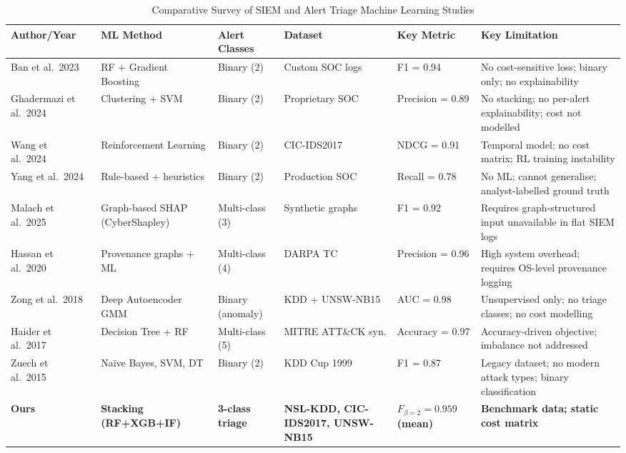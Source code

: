 \documentclass[conference]{IEEEtran}
\begin{document}
\begin{table}[!t]
\centering
\caption{Comparative Survey of SIEM and Alert Triage Machine Learning Studies}
\label{tab:related_comparison}
\renewcommand{\arraystretch}{1.15}
\begin{tabular}{p{2.8cm} p{2.6cm} p{1.8cm} p{2.6cm} p{2.0cm} p{4.0cm}}
\toprule
\textbf{Author/Year} & \textbf{ML Method} & \textbf{Alert Classes} & \textbf{Dataset} & \textbf{Key Metric} & \textbf{Key Limitation} \\
\midrule
Ban et al.\ 2023~\cite{ban2023}
  & RF + Gradient Boosting
  & Binary (2)
  & Custom SOC logs
  & F1 = 0.94
  & No cost-sensitive loss; binary only; no explainability \\
\midrule
Ghadermazi et al.\ 2024~\cite{ghadermazi2024}
  & Clustering + SVM
  & Binary (2)
  & Proprietary SOC
  & Precision = 0.89
  & No stacking; no per-alert explainability; cost not modelled \\
\midrule
Wang et al.\ 2024~\cite{wang2024}
  & Reinforcement Learning
  & Binary (2)
  & CIC-IDS2017
  & NDCG = 0.91
  & Temporal model; no cost matrix; RL training instability \\
\midrule
Yang et al.\ 2024~\cite{yang2024}
  & Rule-based + heuristics
  & Binary (2)
  & Production SOC
  & Recall = 0.78
  & No ML; cannot generalise; analyst-labelled ground truth \\
\midrule
Malach et al.\ 2025~\cite{malach2025}
  & Graph-based SHAP (CyberShapley)
  & Multi-class (3)
  & Synthetic graphs
  & F1 = 0.92
  & Requires graph-structured input unavailable in flat SIEM logs \\
\midrule
Hassan et al.\ 2020~\cite{hassan2019}
  & Provenance graphs + ML
  & Multi-class (4)
  & DARPA TC
  & Precision = 0.96
  & High system overhead; requires OS-level provenance logging \\
\midrule
Zong et al.\ 2018~\cite{zong2018}
  & Deep Autoencoder GMM
  & Binary (anomaly)
  & KDD + UNSW-NB15
  & AUC = 0.98
  & Unsupervised only; no triage classes; no cost modelling \\
\midrule
Haider et al.\ 2017~\cite{haider2017}
  & Decision Tree + RF
  & Multi-class (5)
  & MITRE ATT\&CK syn.
  & Accuracy = 0.97
  & Accuracy-driven objective; imbalance not addressed \\
\midrule
Zuech et al.\ 2015~\cite{zuech2015}
  & Na\"ive Bayes, SVM, DT
  & Binary (2)
  & KDD Cup 1999
  & F1 = 0.87
  & Legacy dataset; no modern attack types; binary classification \\
\midrule
\textbf{Ours}
  & \textbf{Stacking (RF+XGB+IF)}
  & \textbf{3-class triage}
  & \textbf{NSL-KDD, CIC-IDS2017, UNSW-NB15}
  & \textbf{$F_{\beta=2}=0.959$ (mean)}
  & \textbf{Benchmark data; static cost matrix} \\
\bottomrule
\end{tabular}
\end{table}
\end{document}
